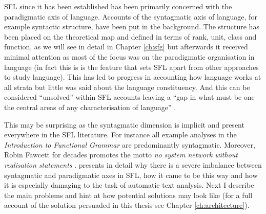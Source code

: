 


SFL since it has been established has been primarily concerned with the paradigmatic axis of language. Accounts of the syntagmatic axis of language, for example syntactic structure, have been put in the background. The structure has been placed on the theoretical map and defined in terms of rank, unit, class and function, as we will see in detail in Chapter \ref{ch:sfg} but afterwards it received minimal attention as most of the focus was on the paradigmatic organisation in language (in fact this is is the feature that sets SFL apart from other approaches to study language). This has led to progress in accounting how language works at all strata but little was said about the language constituency. And this can be considered ``unsolved'' within SFL accounts leaving a ``gap in what must be one the central areas of any characterisation of language'' \citep[25]{Bateman2008}. 


This may be surprising as the syntagmatic dimension is implicit and present everywhere in the SFL literature. For instance all example analyses in the \textit{Introduction to Functional Grammar} \citep{Halliday2013} are predominantly syntagmatic. Moreover, Robin Fawcett for decades promotes the motto \textit{no system network without realisation statements} \citep[9]{Fawcett88-good}. \citet{Bateman2008} presents in detail why there is a severe imbalance between syntagmatic and paradigmatic axes in SFL, how it came to be this way and how it is especially damaging to the task of automatic text analysis. Next I describe the main problems and hint at how potential solutions may look like (for a full account of the solution persuaded in this thesis see Chapter \ref{ch:architecture}). 

